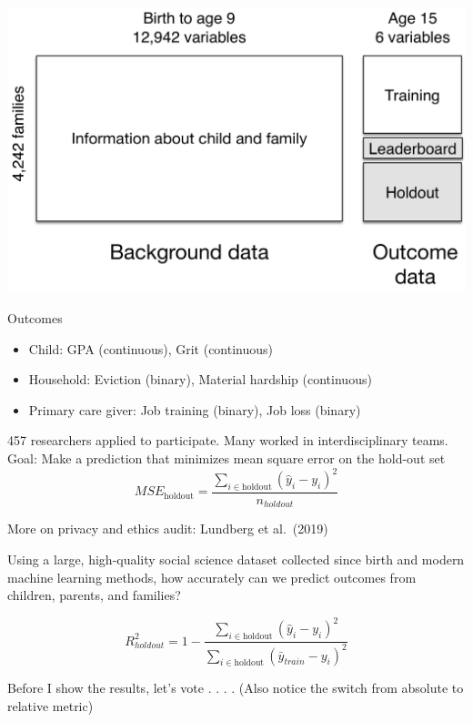 \documentclass[aspectratio=169]{beamer}
\begin{document}
\begin{frame}

\begin{center}
\includegraphics[width=\textwidth]{figures/ffc_design_matrix_ml}
\end{center}

\end{frame}
\begin{frame}

Outcomes
\begin{itemize}
\item Child: GPA (continuous), Grit (continuous)
\item Household:  Eviction (binary), Material hardship (continuous)
\item Primary care giver: Job training (binary), Job loss (binary)
\end{itemize}

\end{frame}
\begin{frame}

457 researchers applied to participate. Many worked in interdisciplinary teams. Goal: Make a prediction that minimizes mean square error on the hold-out set
\begin{equation*}
MSE_{\text{holdout}} = \frac{\sum_{i \in \text{holdout}} (\hat{y}_i - y_i)^2}{n_{holdout}}
\end{equation*}

\vfill
More on privacy and ethics audit: Lundberg et al.\ (2019)
\end{frame}
\begin{frame}

Using a large, high-quality social science dataset collected since birth and modern machine learning methods, how accurately can we predict outcomes from children, parents, and families?

\begin{equation*}
R^2_{holdout} = 1 - \frac{\sum_{i \in \text{holdout}} (\hat{y}_i - y_i)^2}{\sum_{i \in \text{holdout}} (\bar{y}_{train} - y_i)^2}
\end{equation*}

\pause 
\vfill

Before I show the results, let's vote . . . . (Also notice the switch from absolute to relative metric)

\end{frame}
\end{document}

